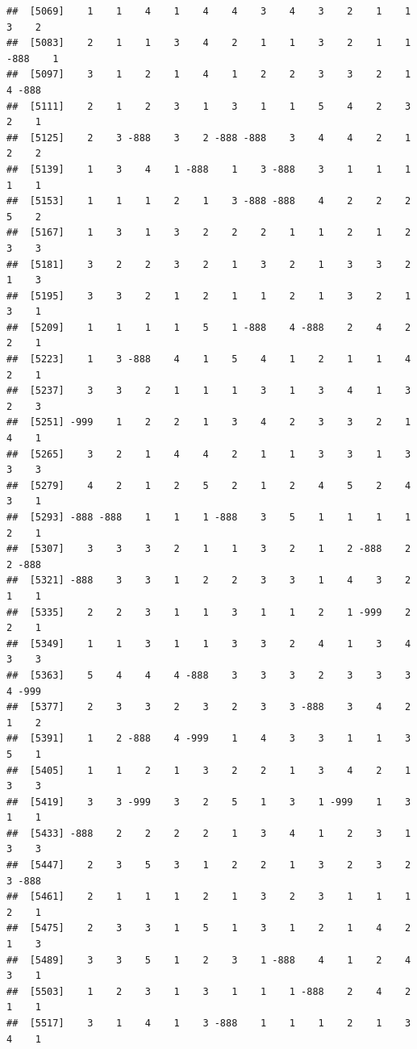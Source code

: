 \documentclass[
  12pt,
  openany]{book}
\begin{document}
\begin{verbatim}
##  [5069]    1    1    4    1    4    4    3    4    3    2    1    1    3    2
##  [5083]    2    1    1    3    4    2    1    1    3    2    1    1 -888    1
##  [5097]    3    1    2    1    4    1    2    2    3    3    2    1    4 -888
##  [5111]    2    1    2    3    1    3    1    1    5    4    2    3    2    1
##  [5125]    2    3 -888    3    2 -888 -888    3    4    4    2    1    2    2
##  [5139]    1    3    4    1 -888    1    3 -888    3    1    1    1    1    1
##  [5153]    1    1    1    2    1    3 -888 -888    4    2    2    2    5    2
##  [5167]    1    3    1    3    2    2    2    1    1    2    1    2    3    3
##  [5181]    3    2    2    3    2    1    3    2    1    3    3    2    1    3
##  [5195]    3    3    2    1    2    1    1    2    1    3    2    1    3    1
##  [5209]    1    1    1    1    5    1 -888    4 -888    2    4    2    2    1
##  [5223]    1    3 -888    4    1    5    4    1    2    1    1    4    2    1
##  [5237]    3    3    2    1    1    1    3    1    3    4    1    3    2    3
##  [5251] -999    1    2    2    1    3    4    2    3    3    2    1    4    1
##  [5265]    3    2    1    4    4    2    1    1    3    3    1    3    3    3
##  [5279]    4    2    1    2    5    2    1    2    4    5    2    4    3    1
##  [5293] -888 -888    1    1    1 -888    3    5    1    1    1    1    2    1
##  [5307]    3    3    3    2    1    1    3    2    1    2 -888    2    2 -888
##  [5321] -888    3    3    1    2    2    3    3    1    4    3    2    1    1
##  [5335]    2    2    3    1    1    3    1    1    2    1 -999    2    2    1
##  [5349]    1    1    3    1    1    3    3    2    4    1    3    4    3    3
##  [5363]    5    4    4    4 -888    3    3    3    2    3    3    3    4 -999
##  [5377]    2    3    3    2    3    2    3    3 -888    3    4    2    1    2
##  [5391]    1    2 -888    4 -999    1    4    3    3    1    1    3    5    1
##  [5405]    1    1    2    1    3    2    2    1    3    4    2    1    3    3
##  [5419]    3    3 -999    3    2    5    1    3    1 -999    1    3    1    1
##  [5433] -888    2    2    2    2    1    3    4    1    2    3    1    3    3
##  [5447]    2    3    5    3    1    2    2    1    3    2    3    2    3 -888
##  [5461]    2    1    1    1    2    1    3    2    3    1    1    1    2    1
##  [5475]    2    3    3    1    5    1    3    1    2    1    4    2    1    3
##  [5489]    3    3    5    1    2    3    1 -888    4    1    2    4    3    1
##  [5503]    1    2    3    1    3    1    1    1 -888    2    4    2    1    1
##  [5517]    3    1    4    1    3 -888    1    1    1    2    1    3    4    1

\end{verbatim}
\end{document}
